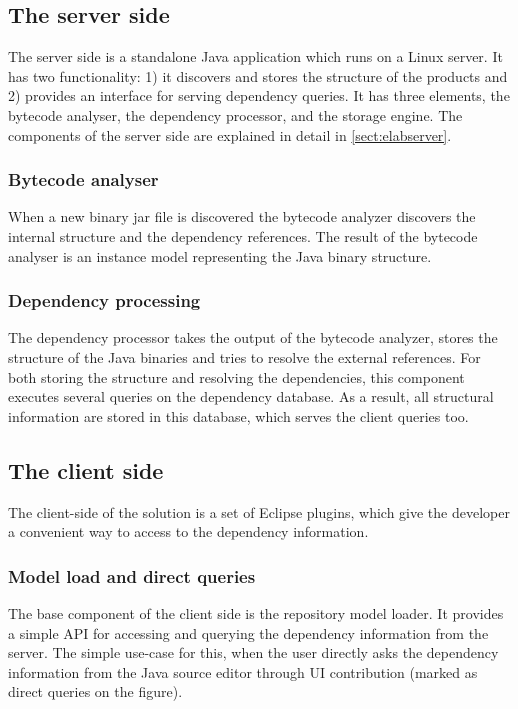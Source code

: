 \subsection{The server side}
The server side is a standalone Java application which runs on a Linux server.
It has two functionality: 1) it discovers and stores the structure of the
products and 2) provides an interface for serving dependency queries. It has three
elements, the bytecode analyser, the dependency processor, and the storage engine.
The components of the server side are explained in detail in \autoref{sect:elabserver}.

\subsubsection{Bytecode analyser}
When a new binary jar file is discovered the bytecode analyzer  discovers the
internal structure and the dependency references. The result of the bytecode
analyser is an instance model representing the Java binary structure.

\subsubsection{Dependency processing}
The dependency processor takes the output of the bytecode analyzer, stores the 
structure of the Java binaries and tries to resolve the external references.
For both storing the structure and resolving the dependencies, this component
executes several queries on the dependency database. As a result, all structural
information are stored in this database, which serves the client queries too.


\subsection{The client side}
The client-side of the solution is a set of  Eclipse plugins, which give the
developer a convenient way to access to the dependency information. 

\subsubsection{Model load and direct queries}\label{sect:directqueries}
The base component of the client side is the repository model loader. It
provides a simple API for accessing and querying the dependency information from
the server. The simple use-case for this, when the user directly asks the
dependency information from the Java source editor through UI contribution
(marked as direct queries on the figure).

